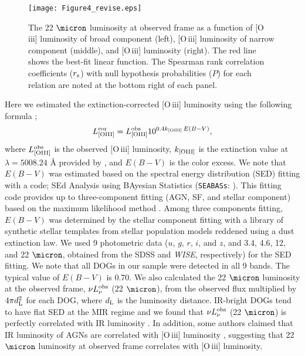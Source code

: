 \documentclass[twocolumn]{aastex6}
\newcommand{\oiii}{[O{\,\sc iii}]\,\,}
\begin{document}
   \begin{figure*}
   \centering
   \texttt{[image: Figure4\_revise.eps]}
   \caption{The 22 $\micron$ luminosity at observed frame as a function of \oiii luminosity of broad component (left), \oiii luminosity of narrow component (middle), and \oiii luminosity (right). The red line shows the best-fit linear function. The Spearman rank correlation coefficients ($r_{\rm s}$) with null hypothesis probabilities ($P$) for each relation are noted at the bottom right of each panel.}
   \label{LOIII_L22}
   \end{figure*}   
Here we estimated the extinction-corrected \oiii luminosity using the following formula \citep[see][]{Calzetti_94,Dominguez};
\begin{equation}
L_{\rm [OIII]}^{\rm cor} = L_{\rm [OIII]}^{\rm obs} 10^{0.4 k_{\rm [OIII]}\, E(B-V)},
\end{equation}
where $L_{\rm [OIII]}^{\rm obs}$ is the observed \oiii luminosity, $k_{\rm [OIII]}$ is the extinction value  at $\lambda = 5008.24$ \AA \,\,provided by \cite{Calzetti}, and $E(B - V)$ is the color excess.
We note that $E (B-V)$ was estimated based on the spectral energy distribution (SED) fitting with a code; SEd Analysis using BAyesian Statistics ({\tt SEABASs}: \citealt{Rovilos}).
This fitting code provides up to three-component fitting (AGN, SF, and stellar component) based on the maximum likelihood method \citep[see][in detail]{Rovilos,Toba_16}.
Among three components fitting, $E (B-V)$ was determined by the stellar component fitting with a library of synthetic stellar templates from \cite{Bruzual} stellar population models reddened using a \cite{Calzetti} dust extinction law.
We used 9 photometric data ($u$, $g$, $r$, $i$, and $z$, and 3.4, 4.6, 12, and 22 $\micron$, obtained from the SDSS and {\it WISE}, respectively) for the SED fitting.
We note that all DOGs in our sample were detected in all 9 bands.
The typical value of $E (B-V)$ is 0.70.
We also calculated the 22 $\micron$ luminosity at the observed frame, $\nu L^{\rm obs}_{\nu}$ (22 $\micron$), from the observed flux multiplied by $4\pi d_{\rm L}^2$ for each DOG, where $d_{\rm L}$ is the luminosity distance.
IR-bright DOGs tend to have flat SED at the MIR regime \citep[see ][]{Toba_16,Toba_17b} and we found that $\nu L^{\rm obs}_{\nu}$ (22 $\micron$) is perfectly correlated with IR luminosity \citep{Toba_17b}.
In addition, some authors claimed that IR luminosity of AGNs are correlated with \oiii luminosity \cite[e.g.,][]{Goto}, suggesting that 22 $\micron$ luminosity at observed frame correlates with \oiii luminosity.
\end{document}
